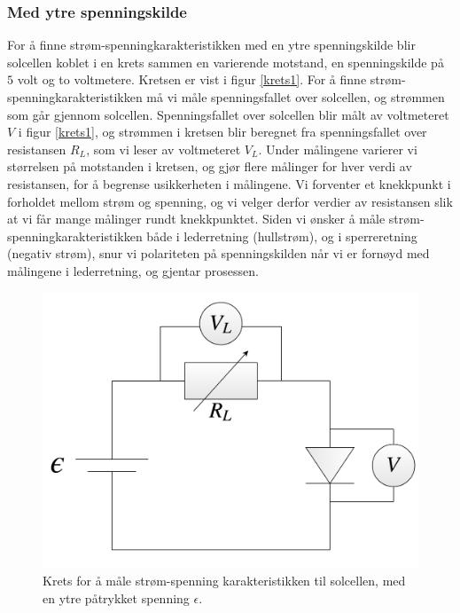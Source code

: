 \documentclass[%
 reprint,
 amsmath,amssymb,
 aps,
 norsk,
 booktabs
]{revtex4-1}
\begin{document}
\subsubsection{Med ytre spenningskilde}
For å finne strøm-spenningkarakteristikken med en ytre spenningskilde blir solcellen koblet i en krets sammen en varierende motstand, en spenningskilde på $5$ volt og to voltmetere. Kretsen er vist i figur \vref{krets1}. For å finne strøm-spenningkarakteristikken må vi måle spenningsfallet over solcellen, og strømmen som går gjennom solcellen. Spenningsfallet over solcellen blir målt av voltmeteret $V$ i figur \vref{krets1}, og strømmen i kretsen blir beregnet fra spenningsfallet over resistansen $R_L$, som vi leser av voltmeteret $V_L$. Under målingene varierer vi størrelsen på motstanden i kretsen, og gjør flere målinger for hver verdi av resistansen, for å begrense usikkerheten i målingene. Vi forventer et knekkpunkt i forholdet mellom strøm og spenning, og vi velger derfor verdier av resistansen slik at vi får mange målinger rundt knekkpunktet. Siden vi ønsker å måle strøm-spenningkarakteristikken både i lederretning (hullstrøm), og i sperreretning (negativ strøm), snur vi polariteten på spenningskilden når vi er fornøyd med målingene i lederretning, og gjentar prosessen.
\begin{figure}[h!]
  \centering
  \includegraphics[scale=0.15]{krets1.png}
  \caption{Krets for å måle strøm-spenning karakteristikken til solcellen, med en ytre påtrykket spenning $\epsilon$.}
  \label{krets1}
\end{figure}
\end{document}

